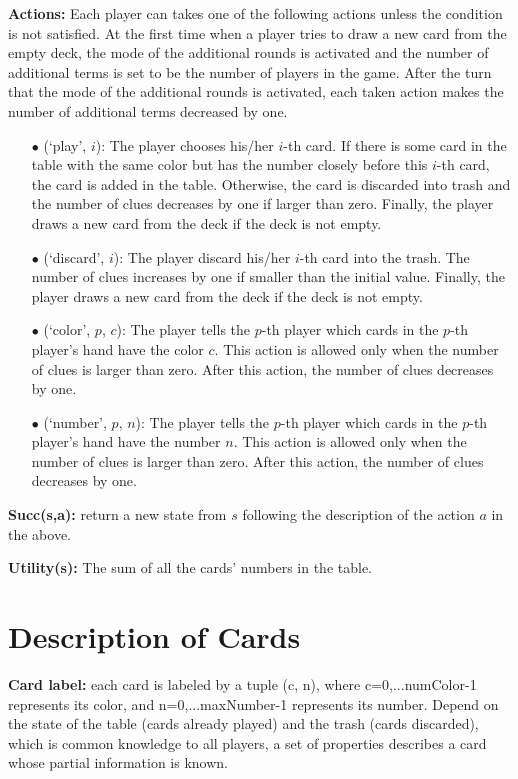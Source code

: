 \documentclass[12pt]{article}
\begin{document}
\textbf{Actions:} Each player can takes one of the following actions unless the condition is not satisfied. At the first time when a player tries to draw a new card from 
the empty deck, the mode of the additional rounds is activated and the number of additional terms is set to be the number of players in the game.
After the turn that the mode of the additional rounds is 
activated, each taken action makes the number of additional terms decreased by one. 
\begin{itemize}
\item[$\bullet$] (`play', $i$):  The player chooses his/her $i$-th card. If there is some card in the table with the same color  but has the number closely 
before this $i$-th card, the card is added in the table. Otherwise, the card is discarded into trash and the number of clues decreases by one if larger than zero. 
Finally, the player draws a new card from the deck if the deck is not empty. 
\item[$\bullet$]  (`discard', $i$): The player discard his/her $i$-th card into the trash. The number of clues increases by one if smaller than the initial value. Finally, 
the player draws a new card from the deck if the deck is not empty. 
\item[$\bullet$] (`color', $p$, $c$): The player tells the $p$-th player which cards in the $p$-th player's hand have the color $c$. This action is allowed only when 
the number of clues is larger than zero. After this action, the number of clues decreases by one.
\item[$\bullet$] (`number', $p$, $n$): The player tells the $p$-th player which cards in the $p$-th player's hand have the number $n$. This action is allowed only when 
the number of clues is larger than zero. After this action, the number of clues decreases by one.
\end{itemize}

\textbf{Succ(s,a):} return a new state from $s$ following the description of the action $a$ in the above. 

\textbf{Utility(s):}  The sum of all the cards' numbers in the table.  

\section{Description of Cards}
\textbf{Card label:} each card is labeled by a tuple (c, n), where c=0,...numColor-1 represents its color, and n=0,...maxNumber-1 represents its number. Depend on the state of the table (cards already played) and the trash (cards discarded), which is common knowledge to all players, a set of properties describes a card whose partial information is known.
\end{document}

